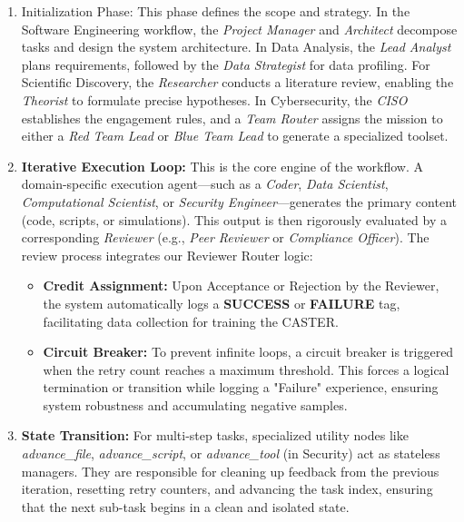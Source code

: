 \documentclass{article}
\theoremstyle{plain}
\theoremstyle{definition}
\theoremstyle{remark}
\begin{document}
\begin{enumerate}[nosep]
    \item Initialization Phase: This phase defines the scope and strategy. 
    In the Software Engineering workflow, the \textit{Project Manager} and \textit{Architect} decompose tasks and design the system architecture. 
    In Data Analysis, the \textit{Lead Analyst} plans requirements, followed by the \textit{Data Strategist} for data profiling. 
    For Scientific Discovery, the \textit{Researcher} conducts a literature review, enabling the \textit{Theorist} to formulate precise hypotheses. 
    In Cybersecurity, the \textit{CISO} establishes the engagement rules, and a \textit{Team Router} assigns the mission to either a \textit{Red Team Lead} or \textit{Blue Team Lead} to generate a specialized toolset.
    
    \item \textbf{Iterative Execution Loop:} This is the core engine of the workflow. A domain-specific execution agent—such as a \textit{Coder}, \textit{Data Scientist}, \textit{Computational Scientist}, or \textit{Security Engineer}—generates the primary content (code, scripts, or simulations). This output is then rigorously evaluated by a corresponding \textit{Reviewer} (e.g., \textit{Peer Reviewer} or \textit{Compliance Officer}). The review process integrates our Reviewer Router logic:
    \begin{itemize}[nosep]
        \item \textbf{Credit Assignment:} Upon Acceptance or Rejection by the Reviewer, the system automatically logs a \textbf{SUCCESS} or \textbf{FAILURE} tag, facilitating data collection for training the CASTER.
        \item \textbf{Circuit Breaker:} To prevent infinite loops, a circuit breaker is triggered when the retry count reaches a maximum threshold. This forces a logical termination or transition while logging a "Failure" experience, ensuring system robustness and accumulating negative samples.
    \end{itemize}
    
    \item \textbf{State Transition:} For multi-step tasks, specialized utility nodes like \textit{advance\_file}, \textit{advance\_script}, or \textit{advance\_tool} (in Security) act as stateless managers. They are responsible for cleaning up feedback from the previous iteration, resetting retry counters, and advancing the task index, ensuring that the next sub-task begins in a clean and isolated state.
\end{enumerate}
\end{document}
